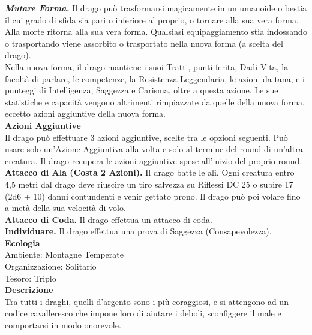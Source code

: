 \begin{multicols}{2}
\emph{\textbf{Mutare Forma.}} Il drago può trasformarsi magicamente in un umanoide o bestia il cui grado di sfida sia pari o inferiore al proprio,  o tornare alla sua vera forma. Alla morte ritorna alla sua vera forma.  Qualsiasi equipaggiamento stia indossando o trasportando viene  assorbito o trasportato nella nuova forma (a scelta del drago).  \\
Nella nuova forma, il drago mantiene i suoi Tratti, punti  ferita, Dadi Vita, la facoltà di parlare, le competenze, la Resistenza  Leggendaria, le azioni da tana, e i punteggi di Intelligenza, Saggezza  e Carisma, oltre a questa azione. Le sue statistiche e capacità  vengono altrimenti rimpiazzate da quelle della nuova forma, eccetto azioni aggiuntive della nuova forma.\\
\textbf{Azioni Aggiuntive}\\
Il drago può effettuare 3 azioni aggiuntive, scelte tra le opzioni  seguenti. Può usare solo un'Azione Aggiuntiva alla volta e solo  al termine del round di un'altra creatura. Il drago recupera le azioni aggiuntive spese all'inizio del proprio round.\\
\textbf{Attacco di Ala (Costa 2 Azioni).} Il drago batte le ali. Ogni creatura entro 4,5 metri dal drago deve riuscire un tiro salvezza su Riflessi DC 25 o subire 17 (2d6 + 10) danni contundenti e  venir gettato prono. Il drago può poi volare fino a metà della sua velocità di volo.\\
\textbf{Attacco di Coda.} Il drago effettua un attacco di coda.\\
\textbf{Individuare.} Il drago effettua una prova di Saggezza (Consapevolezza).\\
\textbf{Ecologia}\\
Ambiente: Montagne Temperate\\
Organizzazione: Solitario\\
Tesoro: Triplo\\
\textbf{Descrizione}\\
Tra tutti i draghi, quelli d'argento sono i più coraggiosi, e si attengono ad un codice cavalleresco che impone loro di aiutare i deboli, sconfiggere il male e comportarsi in modo onorevole.\\


\end{multicols}
